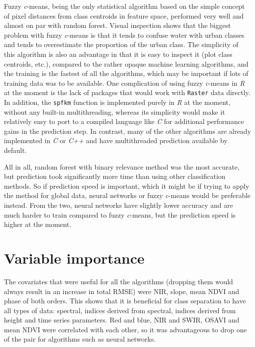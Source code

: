 \documentclass[a4paper,10pt]{book}
\begin{document}
Fuzzy \textit{c}-means, being the only statistical algorithm based on the simple concept of pixel distances from class centroids in feature space, performed very well and almost on par with random forest. Visual inspection shows that the biggest problem with fuzzy \textit{c}-means is that it tends to confuse water with urban classes and tends to overestimate the proportion of the urban class. The simplicity of this algorithm is also an advantage in that it is easy to inspect it (plot class centroids, etc.), compared to the rather opaque machine learning algorithms, and the training is the fastest of all the algorithms, which may be important if lots of training data was to be available. One complication of using fuzzy \textit{c}-means in \textit{R} at the moment is the lack of packages that would work with \texttt{Raster} data directly. In addition, the \texttt{spfkm} function is implemented purely in \textit{R} at the moment, without any built-in multithreading, whereas its simplicity would make it relatively easy to port to a compiled language like \textit{C} for additional performance gains in the prediction step. In contrast, many of the other algorithms are already implemented in \textit{C} or \textit{C++} and have multithreaded prediction available by default.

All in all, random forest with binary relevance method was the most accurate, but prediction took significantly more time than using other classification methods. So if prediction speed is important, which it might be if trying to apply the method for global data, neural networks or fuzzy \textit{c}-means would be preferable instead. From the two, neural networks have slightly lower accuracy and are much harder to train compared to fuzzy \textit{c}-means, but the prediction speed is higher at the moment.

\section{Variable importance}

The covariates that were useful for all the algorithms (dropping them would always result in an increase in total RMSE) were NIR, slope, mean NDVI and phase of both orders. This shows that it is beneficial for class separation to have all types of data: spectral, indices derived from spectral, indices derived from height and time series parameters. Red and blue, NIR and SWIR, OSAVI and mean NDVI were correlated with each other, so it was advantageous to drop one of the pair for algorithms such as neural networks.
\end{document}
